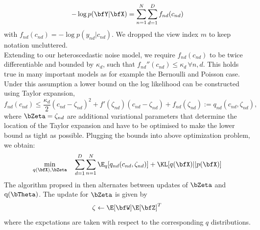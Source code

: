 \begin{equation*}
-\log p(\bfY|\bfX) = \sum_{n=1}^{N} \sum_{d=1}^{D} f_{nd} (c_{nd})
\end{equation*}
with $f_{nd}(c_{nd}) = -\log p(y_{nd}|c_{nd})$. We dropped the view index $m$ to keep notation uncluttered.\\
Extending \cite{Seeger2012} to our heteroscedastic noise model, we require $f_{nd}(c_{nd})$ to be twice differentiable and bounded by $\kappa_d$, such that $f_{nd}''(c_{nd}) \leq \kappa_d \,\forall n,d$. This holds true in many important models as for example the Bernoulli and Poisson case. Under this assumption a lower bound on the log likelihood can be constructed using Taylor expansion,
\begin{equation*}
f_{nd}(c_{nd}) \leq \frac{\kappa_d}{2} (c_{nd} - \zeta_{nd})^2 + f'(\zeta_{nd})(c_{nd} - \zeta_{nd}) + f_{nd}(\zeta_{nd}) := q_{nd}(c_{nd},\zeta_{nd}),
\end{equation*}
where $\bZeta =  \zeta_{nd} $ are additional variational parameters that determine the location of the Taylor expansion and have to be optimised to make the lower bound as tight as possible. Plugging the bounds into above optimization problem, we obtain:
\begin{equation*}
\min_{q(\bfX),\bZeta} \quad \sum_{d=1}^{D}\sum_{n=1}^{N} \E_q [ q_{nd}(c_{nd},\zeta_{nd})] + \KL[q(\bfX)||p(\bfX)]
\end{equation*}
The algorithm propsed in \cite{Seeger2012} then alternates between updates of $\bZeta$ and $\mathrm{q}(\bTheta)$. The update for $\bZeta$ is given by
\begin{equation*}
\zeta \leftarrow \E[\bfW]\E[\bfZ]^{T}
\end{equation*}
where the expctations are taken with respect to the corresponding $q$ distributions.\\
